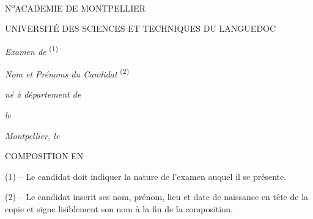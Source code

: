 N\textsuperscript{o}\hfill ACADEMIE DE MONTPELLIER

UNIVERSITÉ DES SCIENCES ET TECHNIQUES DU LANGUEDOC

\textit{Examen de}\textsuperscript{ (1)} \dotfill

\noindent\dotfill

\textit{Nom et Prénoms du Candidat}\textsuperscript{ (2)} \dotfill

\textit{né à} \dotfill\quad \textit{département de} \dotfill

\textit{le} \dotfill{}

\textit{Montpellier, le} \dotfill{}

COMPOSITION EN \dotfill

(1) -- Le candidat doit indiquer la nature de l'examen auquel il se présente.

(2) -- Le candidat inscrit ses nom, prénom, lieu et date de naissance en tête de la copie et signe lisiblement son nom à la fin de la composition.

